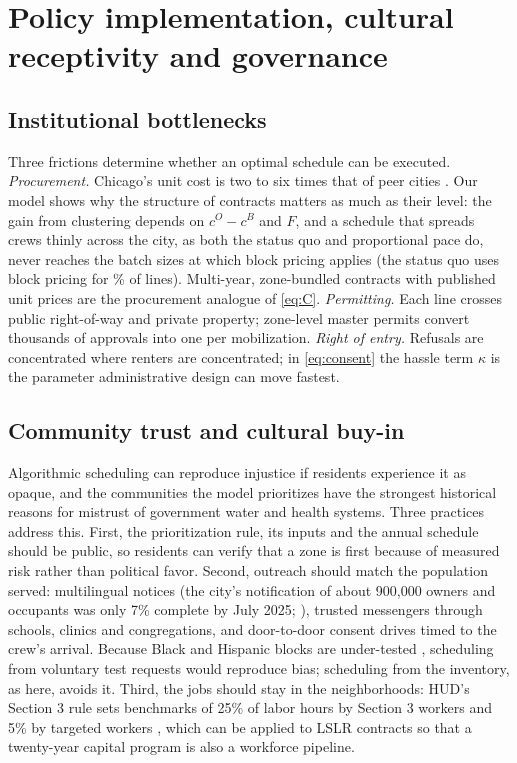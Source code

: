 \documentclass[11pt]{article}
\begin{document}
\section{Policy implementation, cultural receptivity and governance}\label{sec:policy}
\subsection{Institutional bottlenecks}
Three frictions determine whether an optimal schedule can be executed. \emph{Procurement.} Chicago's
unit cost is two to six times that of peer cities \citep{icn2026cost}. Our model shows why the
structure of contracts matters as much as their level: the gain from clustering depends on
$c^O-c^B$ and $F$, and a schedule that spreads crews thinly across the city, as both the status quo
and proportional pace do, never reaches the batch sizes at which block pricing applies (the status
quo uses block pricing for \SQBlock\% of lines). Multi-year, zone-bundled contracts with published
unit prices are the procurement analogue of \cref{eq:C}. \emph{Permitting.} Each line crosses public
right-of-way and private property; zone-level master permits convert thousands of approvals into one
per mobilization. \emph{Right of entry.} Refusals are concentrated where renters are concentrated;
in \cref{eq:consent} the hassle term $\kappa$ is the parameter administrative design can move fastest.

\subsection{Community trust and cultural buy-in}
Algorithmic scheduling can reproduce injustice if residents experience it as opaque, and the
communities the model prioritizes have the strongest historical reasons for mistrust of government
water and health systems. Three practices address this. First, the prioritization rule, its inputs
and the annual schedule should be public, so residents can verify that a zone is first because of
measured risk rather than political favor. Second, outreach should match the population served:
multilingual notices (the city's notification of about 900,000 owners and occupants was only 7\%
complete by July 2025; \citealp{wttw2025}), trusted messengers through schools, clinics and
congregations, and door-to-door consent drives timed to the crew's arrival. Because Black and
Hispanic blocks are under-tested \citep{huynh2024}, scheduling from voluntary test requests would
reproduce bias; scheduling from the inventory, as here, avoids it. Third, the jobs should stay in the
neighborhoods: HUD's Section 3 rule sets benchmarks of 25\% of labor hours by Section 3 workers and
5\% by targeted workers \citep{hud2020section3}, which can be applied to LSLR contracts so that a
twenty-year capital program is also a workforce pipeline.
\end{document}
